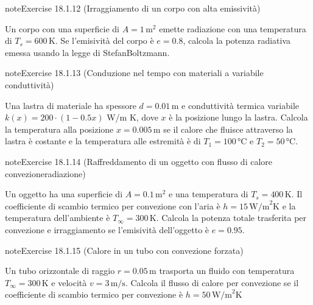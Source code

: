 \documentclass[letterpaper,10pt,italian]{jupyterBook}
\begin{document}
\begin{sphinxadmonition}{note}{Exercise 18.1.12 (Irraggiamento di un corpo con alta emissività)}



\sphinxAtStartPar
Un corpo con una superficie di \(A = 1 \, \text{m}^2\) emette radiazione con una temperatura di \(T_s = 600 \, \text{K}\). Se l’emisività del corpo è \(e = 0.8\), calcola la potenza radiativa emessa usando la legge di Stefan\sphinxhyphen{}Boltzmann.
\end{sphinxadmonition}
 \label{exercise:ch/thermodynamics/heat-transmission-problems-exercise-12}

\begin{sphinxadmonition}{note}{Exercise 18.1.13 (Conduzione nel tempo con materiali a variabile conduttività)}



\sphinxAtStartPar
Una lastra di materiale ha spessore \(d = 0.01 \, \text{m}\) e conduttività termica variabile \(k(x) = 200 \cdot (1 - 0.5x)\) W/m K, dove \(x\) è la posizione lungo la lastra. Calcola la temperatura alla posizione \(x = 0.005 \, \text{m}\) se il calore che fluisce attraverso la lastra è costante e la temperatura alle estremità è di \(T_1 = 100 \, \text{°C}\) e \(T_2 = 50 \, \text{°C}\).
\end{sphinxadmonition}
 \label{exercise:ch/thermodynamics/heat-transmission-problems-exercise-13}

\begin{sphinxadmonition}{note}{Exercise 18.1.14 (Raffreddamento di un oggetto con flusso di calore convezione\sphinxhyphen{}radiazione)}



\sphinxAtStartPar
Un oggetto ha una superficie di \(A = 0.1 \, \text{m}^2\) e una temperatura di \(T_s = 400 \, \text{K}\). Il coefficiente di scambio termico per convezione con l’aria è \(h = 15 \, \text{W/m}^2\text{K}\) e la temperatura dell’ambiente è \(T_\infty = 300 \, \text{K}\). Calcola la potenza totale trasferita per convezione e irraggiamento se l’emisività dell’oggetto è \(e = 0.95\).
\end{sphinxadmonition}
 \label{exercise:ch/thermodynamics/heat-transmission-problems-exercise-14}

\begin{sphinxadmonition}{note}{Exercise 18.1.15 (Calore in un tubo con convezione forzata)}



\sphinxAtStartPar
Un tubo orizzontale di raggio \(r = 0.05 \, \text{m}\) trasporta un fluido con temperatura \(T_\infty = 300 \, \text{K}\) e velocità \(v = 3 \, \text{m/s}\). Calcola il flusso di calore per convezione se il coefficiente di scambio termico per convezione è \(h = 50 \, \text{W/m}^2\text{K}\)
\end{sphinxadmonition}
\end{document}

